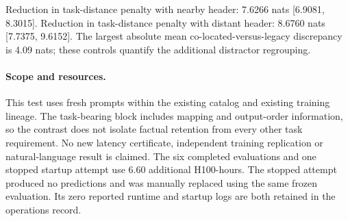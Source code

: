 Reduction in task-distance penalty with nearby header: 7.6266 nats [6.9081, 8.3015].
Reduction in task-distance penalty with distant header: 8.6760 nats [7.7375, 9.6152].
The largest absolute mean co-located-versus-legacy discrepancy is 4.09 nats; these controls quantify the additional distractor regrouping.
\paragraph{Scope and resources.}
This test uses fresh prompts within the existing catalog and existing training lineage. The task-bearing block includes mapping and output-order information, so the contrast does not isolate factual retention from every other task requirement. No new latency certificate, independent training replication or natural-language result is claimed.
The six completed evaluations and one stopped startup attempt use 6.60 additional H100-hours. The stopped attempt produced no predictions and was manually replaced using the same frozen evaluation. Its zero reported runtime and startup logs are both retained in the operations record.

